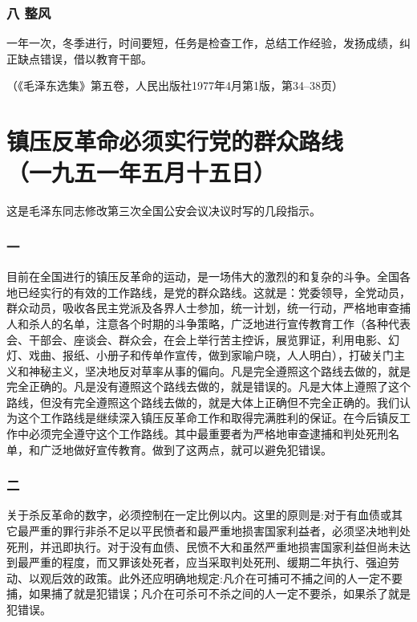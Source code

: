 \documentclass[cn,11pt,chinese]{elegantbook}
\def\myformat#1{\hfil\hfil #1}
\begin{document}
\subsubsection*{\myformat{八 整风}}
一年一次，冬季进行，时间要短，任务是检查工作，总结工作经验，发扬成绩，纠正缺点错误，借以教育干部。\\
\begin{flushright}（《毛泽东选集》第五卷，人民出版社1977年4月第1版，第34--38页）\end{flushright}
\newpage\section*{\myformat{镇压反革命必须实行党的群众路线}\\\myformat{（一九五一年五月十五日）}}
\begin{introduction}\item  这是毛泽东同志修改第三次全国公安会议决议时写的几段指示。\end{introduction}
\subsubsection*{\myformat{一}}
目前在全国进行的镇压反革命的运动，是一场伟大的激烈的和复杂的斗争。全国各地已经实行的有效的工作路线，是党的群众路线。这就是：党委领导，全党动员，群众动员，吸收各民主党派及各界人士参加，统一计划，统一行动，严格地审查捕人和杀人的名单，注意各个时期的斗争策略，广泛地进行宣传教育工作（各种代表会、干部会、座谈会、群众会，在会上举行苦主控诉，展览罪证，利用电影、幻灯、戏曲、报纸、小册子和传单作宣传，做到家喻户晓，人人明白），打破关门主义和神秘主义，坚决地反对草率从事的偏向。凡是完全遵照这个路线去做的，就是完全正确的。凡是没有遵照这个路线去做的，就是错误的。凡是大体上遵照了这个路线，但没有完全遵照这个路线去做的，就是大体上正确但不完全正确的。我们认为这个工作路线是继续深入镇压反革命工作和取得完满胜利的保证。在今后镇反工作中必须完全遵守这个工作路线。其中最重要者为严格地审查逮捕和判处死刑名单，和广泛地做好宣传教育。做到了这两点，就可以避免犯错误。\\
\subsubsection*{\myformat{二}}
关于杀反革命的数字，必须控制在一定比例以内。这里的原则是:对于有血债或其它最严重的罪行非杀不足以平民愤者和最严重地损害国家利益者，必须坚决地判处死刑，并迅即执行。对于没有血债、民愤不大和虽然严重地损害国家利益但尚未达到最严重的程度，而又罪该处死者，应当采取判处死刑、缓期二年执行、强迫劳动、以观后效的政策。此外还应明确地规定:凡介在可捕可不捕之间的人一定不要捕，如果捕了就是犯错误；凡介在可杀可不杀之间的人一定不要杀，如果杀了就是犯错误。\\
\end{document}
